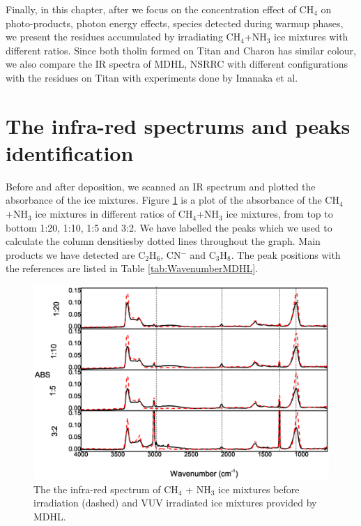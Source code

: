 Finally, in this chapter, after we focus on the concentration effect of CH$_4$ on photo-products, photon energy effects, species detected during warmup phases, we present the residues accumulated by irradiating CH$_4$+NH$_3$ ice mixtures with different ratios. Since both tholin formed on Titan and Charon has similar colour, we also compare the IR spectra of MDHL, NSRRC with different configurations with the residues on Titan with experiments done by Imanaka et al.\\
\section{The infra-red spectrums and peaks identification}
Before and after deposition, we scanned an IR spectrum and plotted the absorbance of the ice mixtures. Figure \ref{fig:widerange} is a plot of the absorbance of the CH$_4$+NH$_3$ ice mixtures in different ratios of CH$_4$+NH$_3$ ice mixtures, from top to bottom 1:20, 1:10, 1:5 and 3:2. We have labelled the peaks which we used to calculate the column densitiesby dotted lines throughout the graph. Main products we have detected are C$_2$H$_6$, CN$^-$ and C$_3$H$_8$. The peak positions with the references are listed in Table \ref{tab:WavenumberMDHL}.\\

\begin{figure}
\centering
\includegraphics[width=\textwidth]{figures/chapter3/widerange.eps}
\caption{The the infra-red spectrum of CH$_4$ + NH$_3$ ice mixtures before irradiation (dashed) and VUV irradiated ice mixtures provided by MDHL. }
\label{fig:widerange}
\end{figure}

